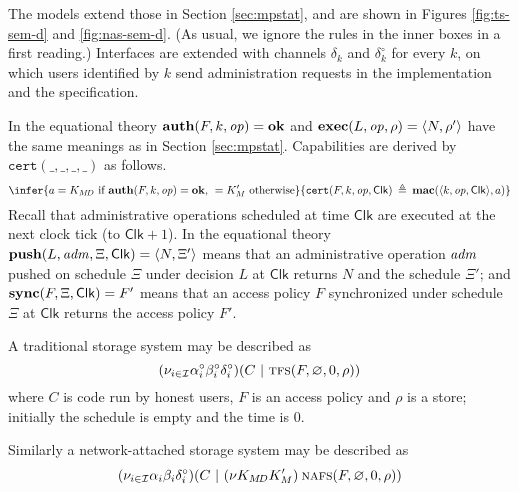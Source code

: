 \documentclass[10pt]{article}
\newcommand{\func}[1]{{\bf #1}}
\newcommand{\clk}{\mathsf{Clk}}
\newcommand{\op}{{\it op}}
\newcommand{\adm}{{\it adm}}
\newcommand{\tup}[1]{\langle #1\rangle}
\newcommand{\new}[2]{(\nu #1)\:#2}
\newcommand{\betac}{\beta^\circ}
\newcommand{\alphac}{\alpha^\circ}
\newcommand{\deltac}{\delta^\circ}
\begin{document}
The models extend those in Section \ref{sec:mpstat}, and are shown in Figures \ref{fig:ts-sem-d} and \ref{fig:nas-sem-d}. (As usual, we ignore the rules in the inner boxes in a first reading.) Interfaces are extended with channels $\delta_k$ and $\deltac_k$ for every $k$, on which users identified by $k$ send administration requests in the implementation and the specification. 

In the equational theory $\func{auth}(F,k,\op) = \func{ok}$ and $\func{exec}(L,\op,\rho) = \tup{N,\rho'}$ have the same meanings as in Section \ref{sec:mpstat}. Capabilities are derived by $\mathtt{cert}(\_,\_,\_,\_)$ as follows. 
$$\infer
	{a = K_{M\!D}\mbox{ if }\func{auth}(F,k,\op) = \func{ok}\mbox{, }=K'_M\mbox{ otherwise}}
	{\mathtt{cert}(F,k,\op,\clk) \:\triangleq\: \func{mac}(\tup{k,\op,\clk},a)}
$$
Recall that administrative operations scheduled at time $\clk$ are executed at the next clock tick (to $\clk+1$). In the equational theory $\func{push}(L,\adm,\Xi,\clk) = \tup{N,\Xi'}$ means that an administrative operation $\adm$ pushed on schedule $\Xi$ under decision $L$ at $\clk$ returns $N$ and the schedule $\Xi'$; and $\func{sync}(F,\Xi,\clk) = F'$ means that an access policy $F$ synchronized under schedule $\Xi$ at $\clk$ returns the access policy $F'$.

A traditional storage system may be described as
$$(\nu_{i \in \mathcal I}\alphac_i\betac_i\deltac_i)(C~|~\textsc{tfs}(F,\varnothing,0,\rho))$$
where $C$ is code run by honest users, $F$ is an access policy and $\rho$ is a store; initially the schedule is empty and the time is $0$.

Similarly a network-attached storage system may be described as
$$(\nu_{i \in \mathcal I}\alpha_i\beta_i\deltac_i)(C~|~\new{K_{M\!D}K'_M}\textsc{nafs}(F,\varnothing,0,\rho))$$
\end{document}
